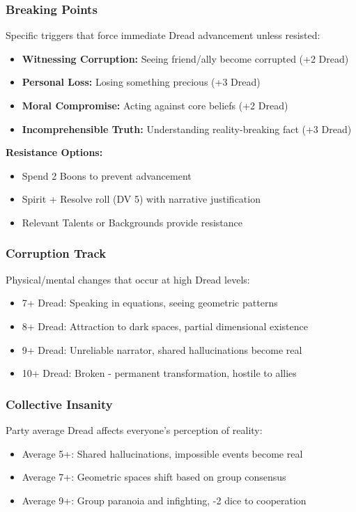 \documentclass[11pt]{article}
\begin{document}
\subsubsection{Breaking Points}

Specific triggers that force immediate Dread advancement unless resisted:
\begin{itemize}
\item \textbf{Witnessing Corruption:} Seeing friend/ally become corrupted (+2 Dread)
\item \textbf{Personal Loss:} Losing something precious (+3 Dread)
\item \textbf{Moral Compromise:} Acting against core beliefs (+2 Dread)
\item \textbf{Incomprehensible Truth:} Understanding reality-breaking fact (+3 Dread)
\end{itemize}

\textbf{Resistance Options:}
\begin{itemize}
\item Spend 2 Boons to prevent advancement
\item Spirit + Resolve roll (DV 5) with narrative justification
\item Relevant Talents or Backgrounds provide resistance
\end{itemize}

\subsubsection{Corruption Track}

Physical/mental changes that occur at high Dread levels:
\begin{itemize}
\item 7+ Dread: Speaking in equations, seeing geometric patterns
\item 8+ Dread: Attraction to dark spaces, partial dimensional existence
\item 9+ Dread: Unreliable narrator, shared hallucinations become real
\item 10+ Dread: Broken - permanent transformation, hostile to allies
\end{itemize}

\subsubsection{Collective Insanity}

Party average Dread affects everyone's perception of reality:
\begin{itemize}
\item Average 5+: Shared hallucinations, impossible events become real
\item Average 7+: Geometric spaces shift based on group consensus
\item Average 9+: Group paranoia and infighting, -2 dice to cooperation
\end{itemize}
\end{document}

